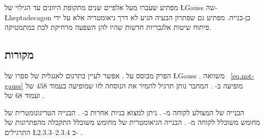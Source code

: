 מפתיע שעברו מעל אלפיים שנים מתקופת היוונים עד הגילוי של 
\L{Gauss}
שה-%
\L{heptadecagon}
בן-בנייה. מפתיע גם שפתרון הבעיה הגיע לא דרך גיאומטריה אלא על ידי פיתוח שיטות אלגבריות חדשות שהיו להן השפעה מרחיקת לכת במתמטיקה.

\subsection*{מקורות}

הפרק מבוסס על
\cite{jorg}.
אפשר לעיין בתרגום לאנגלית של ספרו של 
\L{Gauss}
\cite{gauss}.
משוואה%
~\ref{eq.not-gauss}
מופיעה ב-%
\cite{rike}.
המחבר נותן תרגיל להמיר את הנוסחה לזו שמופיעה בעמוד 
$458$
של
\cite{gauss}
ועמוד
$68$
של
\cite{jorg}.


הבנייה של המצולע לקוחה מ-%
\cite{callagy}.
ניתן למצוא בניות אחרות ב-%
\cite{wiki:heptadecagon}.
הבנייה הטריגונומטרית של מחומש משוכלל לקוחה מ-%
\cite{wiki:pentagon}.
הבנייה הגיאומטרית של מחומש משוכלל התקבלה מהפתרונות של התרגילים
\L{2.3.3--2.3.4}
ב-%
\cite{stillwell}.
